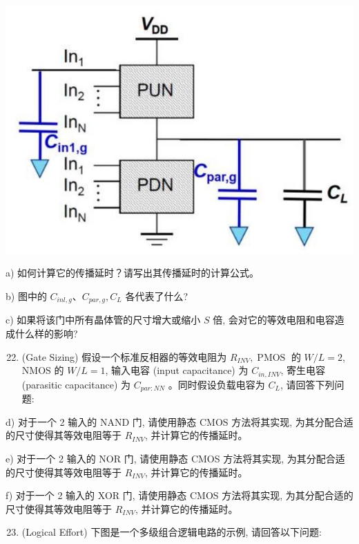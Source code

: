 \documentclass[10pt]{article}
\begin{document}
\begin{center}
\includegraphics[max width=\textwidth]{2024_05_20_f1af48ad54173fe448ecg-6(1)}
\end{center}

a) 如何计算它的传播延时？请写出其传播延时的计算公式。

b) 图中的 $C_{i n l, g} 、 C_{p a r, g}, C_{L}$ 各代表了什么?

c) 如果将该门中所有晶体管的尺寸增大或缩小 $S$ 倍, 会对它的等效电阻和电容造成什么样的影响?

\begin{enumerate}
  \setcounter{enumi}{21}
  \item (Gate Sizing) 假设一个标准反相器的等效电阻为 $R_{I N V}, \operatorname{PMOS}$ 的 $W / L=2$, NMOS 的 $W / L=1$, 输入电容 (input capacitance) 为 $C_{i n, I N V}$, 寄生电容 (parasitic capacitance) 为 $C_{p a r: N N}$ 。同时假设负载电容为 $C_{L}$, 请回答下列问题:
\end{enumerate}

d) 对于一个 2 输入的 NAND 门, 请使用静态 CMOS 方法将其实现, 为其分配合适的尺寸使得其等效电阻等于 $R_{I N V}$, 并计算它的传播延时。

e) 对于一个 2 输入的 NOR 门, 请使用静态 CMOS 方法将其实现, 为其分配合适的尺寸使得其等效电阻等于 $R_{I N V}$, 并计算它的传播延时。

f) 对于一个 2 输入的 XOR 门, 请使用静态 CMOS 方法将其实现, 为其分配合适的尺寸使得其等效电阻等于 $R_{I N V}$, 并计算它的传播延时。

\begin{enumerate}
  \setcounter{enumi}{22}
  \item (Logical Effort) 下图是一个多级组合逻辑电路的示例, 请回答以下问题:
\end{enumerate}
\end{document}
